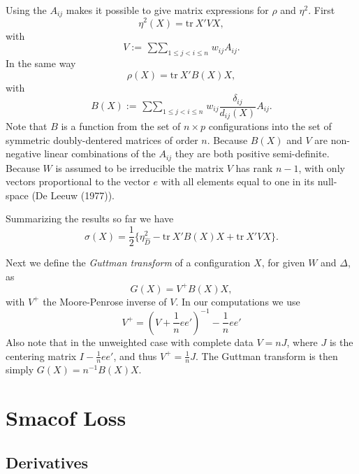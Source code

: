 \documentclass[
  12pt,
]{article}
\newcommand{\jis}{\mathop{\sum\sum}_{1\leq j<i\leq n}}
\begin{document}
Using the \(A_{ij}\) makes it possible to give matrix expressions for \(\rho\)
and \(\eta^2\). First
\begin{equation}
\eta^2(X)=\text{tr}\ X'VX,
\label{eq:etamat}
\end{equation}
with
\begin{equation}
V:=\jis w_{ij}A_{ij}.
\label{eq:vdef}
\end{equation}
In the same way
\begin{equation}
\rho(X)=\text{tr}\ X'B(X)X,
\label{eq:rhomat}
\end{equation}
with
\begin{equation}
B(X):=\jis w_{ij}\frac{\delta_{ij}}{d_{ij}(X)}A_{ij}.
\label{eq:bdef}
\end{equation}
Note that \(B\) is a function from the set of \(n\times p\) configurations into the set of symmetric doubly-dentered matrices of order \(n\). Because \(B(X)\) and \(V\) are
non-negative linear combinations of the \(A_{ij}\) they are both positive semi-definite.
Because \(W\) is assumed to be irreducible the matrix \(V\) has rank \(n-1\), with only
vectors proportional to the vector \(e\) with all elements equal to one in its null-space (De Leeuw (1977)).

Summarizing the results so far we have
\begin{equation}
\sigma(X)=\frac12\{\eta_{\hat D}^2-\text{tr}\ X'B(X)X+\text{tr}\ X'VX\}.
\label{eq:sigmat}
\end{equation}

Next we define the \emph{Guttman transform} of a configuration \(X\), for given \(W\) and
\(\Delta\), as
\begin{equation}
G(X)=V^+B(X)X,
\label{eq:gudef}
\end{equation}
with \(V^+\) the Moore-Penrose inverse of \(V\). In our computations we use
\[
V^+=(V+\frac{1}{n}ee')^{-1}-\frac{1}{n}ee'
\]
Also note that in the unweighted case with complete data
\(V=nJ\), where \(J\) is the centering matrix \(I-\frac{1}{n}ee'\), and thus
\(V^+=\frac{1}{n}J\). The Guttman transform is then simply \(G(X)=n^{-1}B(X)X\).

\section{Smacof Loss}\label{smacof-loss}

\subsection{Derivatives}\label{derivatives}
\end{document}
